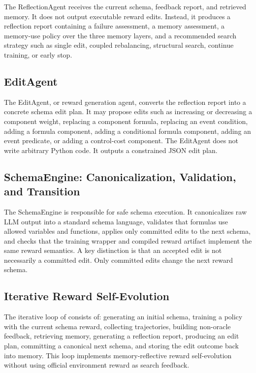 The ReflectionAgent receives the current schema, feedback report, and retrieved memory. It does not output executable reward edits. Instead, it produces a reflection report containing a failure assessment, a memory assessment, a memory-use policy over the three memory layers, and a recommended search strategy such as single edit, coupled rebalancing, structural search, continue training, or early stop.

\subsection{EditAgent}

The EditAgent, or reward generation agent, converts the reflection report into a concrete schema edit plan. It may propose edits such as increasing or decreasing a component weight, replacing a component formula, replacing an event condition, adding a formula component, adding a conditional formula component, adding an event predicate, or adding a control-cost component. The EditAgent does not write arbitrary Python code. It outputs a constrained JSON edit plan.

\subsection{SchemaEngine: Canonicalization, Validation, and Transition}

The SchemaEngine is responsible for safe schema execution. It canonicalizes raw LLM output into a standard schema language, validates that formulas use allowed variables and functions, applies only committed edits to the next schema, and checks that the training wrapper and compiled reward artifact implement the same reward semantics. A key distinction is that an accepted edit is not necessarily a committed edit. Only committed edits change the next reward schema.

\subsection{Iterative Reward Self-Evolution}

The iterative loop of \methodname{} consists of: generating an initial schema, training a policy with the current schema reward, collecting trajectories, building non-oracle feedback, retrieving memory, generating a reflection report, producing an edit plan, committing a canonical next schema, and storing the edit outcome back into memory. This loop implements memory-reflective reward self-evolution without using official environment reward as search feedback.
